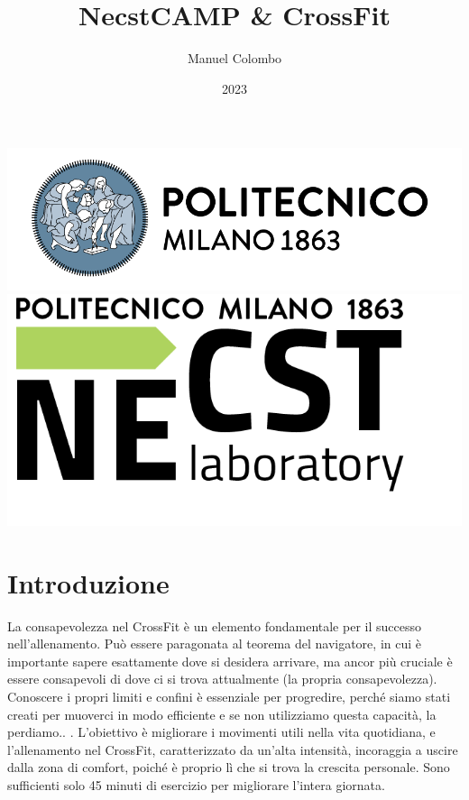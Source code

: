 \documentclass[12pt,oneside,a4paper]{article}
\title{\textbf{NecstCAMP \& CrossFit}}
\author{Manuel Colombo}
\date{2023}
\begin{document}
\begin{titlepage}
	\centering
	\clearpage
	\maketitle
	\thispagestyle{empty}
	\vspace*{1cm}
	\vfill
	\centering
	\includegraphics{logo_polimi.png}\includegraphics{logo_NECST.png}
\end{titlepage}


\section{Introduzione} \label{sec:intro}
La consapevolezza nel CrossFit è un elemento fondamentale per il successo nell'allenamento. Può essere paragonata al teorema del navigatore, in cui è importante sapere esattamente dove si desidera arrivare, ma ancor più cruciale è essere consapevoli di dove ci si trova attualmente (la propria consapevolezza). Conoscere i propri limiti e confini è essenziale per progredire, perché siamo stati creati per muoverci in modo efficiente e se non utilizziamo questa capacità, la perdiamo.. . L'obiettivo è migliorare i movimenti utili nella vita quotidiana, e l'allenamento nel CrossFit, caratterizzato da un'alta intensità, incoraggia a uscire dalla zona di comfort, poiché è proprio lì che si trova la crescita personale. Sono sufficienti solo 45 minuti di esercizio per migliorare l'intera giornata.  
\end{document}
